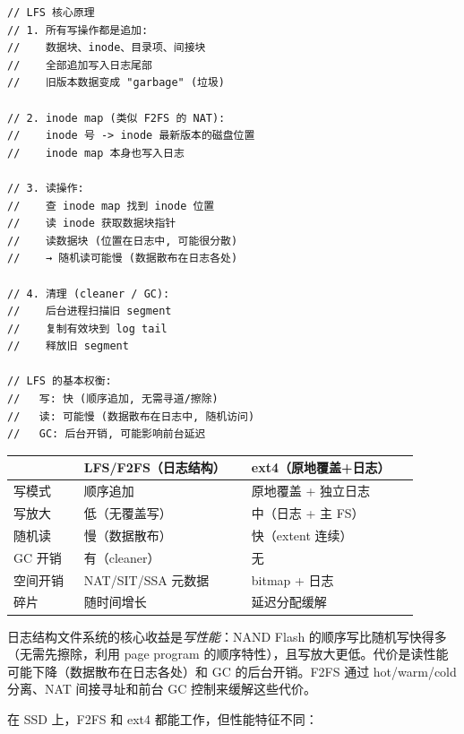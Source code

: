 \begin{filesystemlayout}
\begin{lstlisting}
// LFS 核心原理
// 1. 所有写操作都是追加:
//    数据块、inode、目录项、间接块
//    全部追加写入日志尾部
//    旧版本数据变成 "garbage" (垃圾)

// 2. inode map (类似 F2FS 的 NAT):
//    inode 号 -> inode 最新版本的磁盘位置
//    inode map 本身也写入日志

// 3. 读操作:
//    查 inode map 找到 inode 位置
//    读 inode 获取数据块指针
//    读数据块 (位置在日志中, 可能很分散)
//    → 随机读可能慢 (数据散布在日志各处)

// 4. 清理 (cleaner / GC):
//    后台进程扫描旧 segment
//    复制有效块到 log tail
//    释放旧 segment

// LFS 的基本权衡:
//   写: 快 (顺序追加, 无需寻道/擦除)
//   读: 可能慢 (数据散布在日志中, 随机访问)
//   GC: 后台开销, 可能影响前台延迟
\end{lstlisting}

\begin{longtable}{|F{0.16\linewidth}|F{0.38\linewidth}|F{0.38\linewidth}|}
\toprule
{}
& LFS/F2FS（日志结构） & ext4（原地覆盖+日志） \\
\midrule
写模式 & 顺序追加 & 原地覆盖 + 独立日志 \\\tablerowrule
写放大 & 低（无覆盖写） & 中（日志 + 主 FS） \\\tablerowrule
随机读 & 慢（数据散布） & 快（extent 连续） \\\tablerowrule
GC 开销 & 有（cleaner） & 无 \\\tablerowrule
空间开销 & NAT/SIT/SSA 元数据 & bitmap + 日志 \\\tablerowrule
碎片 & 随时间增长 & 延迟分配缓解 \\
\bottomrule
\end{longtable}

\begin{keyidea}
日志结构文件系统的核心收益是\emph{写性能}：NAND Flash 的顺序写比随机写快得多（无需先擦除，利用 page program 的顺序特性），且写放大更低。代价是读性能可能下降（数据散布在日志各处）和 GC 的后台开销。F2FS 通过 hot/warm/cold 分离、NAT 间接寻址和前台 GC 控制来缓解这些代价。
\end{keyidea}


在 SSD 上，F2FS 和 ext4 都能工作，但性能特征不同：


\end{filesystemlayout}
